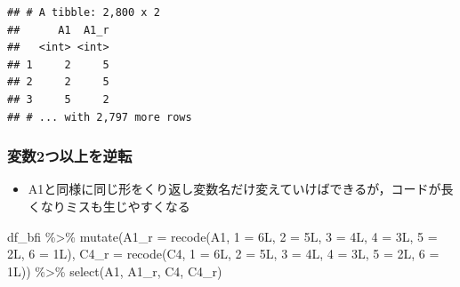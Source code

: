 \documentclass[
  xelatex,ja=standard, b5paper]{bxjsbook}
\newenvironment{Shaded}{\begin{snugshade}}{\end{snugshade}}
\newcommand{\AttributeTok}[1]{\textcolor[rgb]{0.77,0.63,0.00}{#1}}
\newcommand{\FunctionTok}[1]{\textcolor[rgb]{0.00,0.00,0.00}{#1}}
\newcommand{\NormalTok}[1]{#1}
\newcommand{\OtherTok}[1]{\textcolor[rgb]{0.56,0.35,0.01}{#1}}
\newcommand{\SpecialCharTok}[1]{\textcolor[rgb]{0.00,0.00,0.00}{#1}}
\newcommand{\StringTok}[1]{\textcolor[rgb]{0.31,0.60,0.02}{#1}}
\providecommand{\tightlist}{%
  \setlength{\itemsep}{0pt}\setlength{\parskip}{0pt}}
\begin{document}
\begin{verbatim}
## # A tibble: 2,800 x 2
##      A1  A1_r
##   <int> <int>
## 1     2     5
## 2     2     5
## 3     5     2
## # ... with 2,797 more rows
\end{verbatim}

\hypertarget{mu-rev-recode1}{%
\subsubsection{変数2つ以上を逆転}\label{mu-rev-recode1}}

\begin{itemize}
\tightlist
\item
  A1と同様に同じ形をくり返し変数名だけ変えていけばできるが，コードが長くなりミスも生じやすくなる
\end{itemize}

\begin{Shaded}
\begin{Highlighting}[]
\NormalTok{df\_bfi }\SpecialCharTok{\%\textgreater{}\%} 
  \FunctionTok{mutate}\NormalTok{(}\AttributeTok{A1\_r =} \FunctionTok{recode}\NormalTok{(A1, }\StringTok{\textasciigrave{}}\AttributeTok{1}\StringTok{\textasciigrave{}} \OtherTok{=}\NormalTok{ 6L, }\StringTok{\textasciigrave{}}\AttributeTok{2}\StringTok{\textasciigrave{}} \OtherTok{=}\NormalTok{ 5L, }\StringTok{\textasciigrave{}}\AttributeTok{3}\StringTok{\textasciigrave{}} \OtherTok{=}\NormalTok{ 4L, }
                           \StringTok{\textasciigrave{}}\AttributeTok{4}\StringTok{\textasciigrave{}} \OtherTok{=}\NormalTok{ 3L, }\StringTok{\textasciigrave{}}\AttributeTok{5}\StringTok{\textasciigrave{}} \OtherTok{=}\NormalTok{ 2L, }\StringTok{\textasciigrave{}}\AttributeTok{6}\StringTok{\textasciigrave{}} \OtherTok{=}\NormalTok{ 1L),}
         \AttributeTok{C4\_r =} \FunctionTok{recode}\NormalTok{(C4, }\StringTok{\textasciigrave{}}\AttributeTok{1}\StringTok{\textasciigrave{}} \OtherTok{=}\NormalTok{ 6L, }\StringTok{\textasciigrave{}}\AttributeTok{2}\StringTok{\textasciigrave{}} \OtherTok{=}\NormalTok{ 5L, }\StringTok{\textasciigrave{}}\AttributeTok{3}\StringTok{\textasciigrave{}} \OtherTok{=}\NormalTok{ 4L, }
                           \StringTok{\textasciigrave{}}\AttributeTok{4}\StringTok{\textasciigrave{}} \OtherTok{=}\NormalTok{ 3L, }\StringTok{\textasciigrave{}}\AttributeTok{5}\StringTok{\textasciigrave{}} \OtherTok{=}\NormalTok{ 2L, }\StringTok{\textasciigrave{}}\AttributeTok{6}\StringTok{\textasciigrave{}} \OtherTok{=}\NormalTok{ 1L)) }\SpecialCharTok{\%\textgreater{}\%} 
  \FunctionTok{select}\NormalTok{(A1, A1\_r, C4, C4\_r)}
\end{Highlighting}
\end{Shaded}
\end{document}
